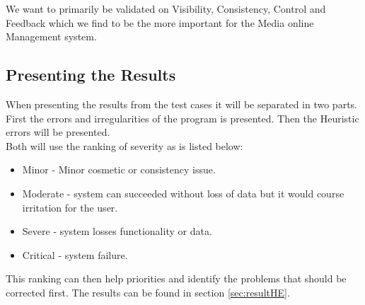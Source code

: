 We want to primarily be validated on Visibility, Consistency, Control and Feedback which we find to be the more important for the Media online Management system.

\subsection{Presenting the Results}
When presenting the results from the test cases it will be separated in two parts. First the errors and irregularities of the program is presented. Then the Heuristic errors will be presented.\\
Both will use the ranking of severity as is listed below:

\begin{itemize}
    \item Minor - Minor cosmetic or consistency issue.
    \item Moderate - system can succeeded without loss of data but it would course irritation for the user. 
		\item Severe - system losses functionality or data.
    \item Critical - system failure.
\end{itemize}

This ranking can then help priorities and identify the problems that should be corrected first. The results can be found in section \vref{sec:resultHE}.

